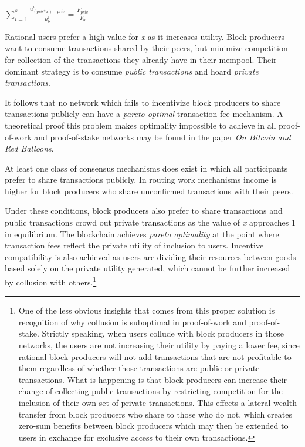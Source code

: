 \documentclass[oneside]{article}   	%
\begin{document}
\LARGE
\begin{adjustwidth}{1.5em}{1.5em} 
\begin{math}
\sum_{i=1}^{s} \frac{u_{({pub}*{x})+{priv}}^i}{u_b^i} = \frac{F_{{priv}}}{F_b}
\end{math}
\end{adjustwidth}
\normalsize

Rational users prefer a high value for \textit{x} as it increases utility. Block producers want to consume transactions shared by their peers, but minimize competition for collection of the transactions they already have in their mempool. Their dominant strategy is to consume \textit{public transactions} and hoard \textit{private transactions}.

It follows that no network which fails to incentivize block producers to share transactions publicly can have a \textit{pareto optimal} transaction fee mechanism. A theoretical proof this problem makes optimality impossible to achieve in all proof-of-work and proof-of-stake networks may be found in the paper \textit{On Bitcoin and Red Balloons}.

At least one class of consensus mechanisms does exist in which all participants prefer to share transactions publicly. In routing work mechanisms income is higher for block producers who share unconfirmed transactions with their peers.

Under these conditions, block producers also prefer to share transactions and public transactions crowd out private transactions as the value of \textit{x} approaches 1 in equilibrium. The blockchain achieves \textit{pareto optimality} at the point where transaction fees reflect the private utility of inclusion to users. Incentive compatibility is also achieved as users are dividing their resources between goods based solely on the private utility generated, which cannot be further increased by collusion with others.\footnote{One of the less obvious insights that comes from this proper solution is recognition of why collusion is suboptimal in proof-of-work and proof-of-stake. Strictly speaking, when users collude with block producers in those networks, the users are not increasing their utility by paying a lower fee, since rational block producers will not add transactions that are not profitable to them regardless of whether those transactions are public or private transactions. What is happening is that block producers can increase their change of collecting public transactions by restricting competition for the inclusion of their own set of private transactions. This effects a lateral wealth transfer from block producers who share to those who do not, which creates zero-sum benefits between block producers which may then be extended to users in exchange for exclusive access to their own transactions.}
\end{document}
